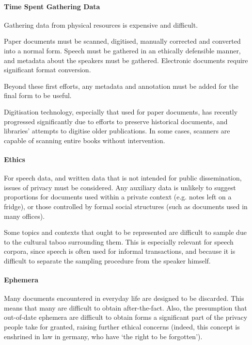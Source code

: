 \paragraph{Time Spent Gathering Data}
Gathering data from physical resources is expensive and difficult.  

Paper documents must be scanned, digitised, manually corrected and converted into a normal form. Speech must be gathered in an ethically defensible manner, and metadata about the speakers must be gathered.  Electronic documents require significant format conversion.

Beyond these first efforts, any metadata and annotation must be added for the final form to be useful.

Digitisation technology, especially that used for paper documents, has recently progressed significantly due to efforts to preserve historical documents, and libraries' attempts to digitise older publications. In some cases, scanners are capable of scanning entire books without intervention.




\paragraph{Ethics}
For speech data, and written data that is not intended for public dissemination, issues of privacy must be considered.  Any auxiliary data is unlikely to suggest proportions for documents used within a private context (e.g. notes left on a fridge), or those controlled by formal social structures (such as documents used in many offices).

Some topics and contexts that ought to be represented are difficult to sample due to the cultural taboo surrounding them. This is especially relevant for speech corpora, since speech is often used for informal transactions, and because it is difficult to separate the sampling procedure from the speaker himself.



\paragraph{Ephemera}
Many documents encountered in everyday life are designed to be discarded. This means that many are difficult to obtain after-the-fact.  Also, the presumption that out-of-date ephemera are difficult to obtain forms a significant part of the privacy people take for granted, raising further ethical concerns (indeed, this concept is enshrined in law in germany, who have `the right to be forgotten').


